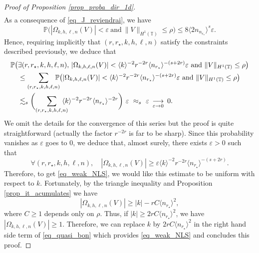 \begin{proof}[Proof of Proposition \ref{prop_proba_dir_1d}]
\begin{multline*}
\end{multline*}
As a consequence of \eqref{eq_J_reviendrai}, we have
\[
\mathbb{P}\big(|\Omega_{k,h,\ell,n}(V)| < \varepsilon \ \text{and} \ \| V\|_{H^1(\mathbb{T})} \leq \rho \big) \leq 8 \langle 2n_{n_{r_\star}} \rangle^{s} \varepsilon.
\]
Hence, requiring implicitly that $(r,r_\star,k,h,\ell,n)$ satisfy the constraints described previously, we deduce that
\begin{equation*}
\begin{split}
\mathbb{P}\big(&\exists (r,r_\star,k,h,\ell,n),\, |\Omega_{k,h,\ell,n}(V)| < \langle k \rangle^{-2} r^{-2r} \langle n_{r_\star} \rangle^{-(s+2r)} \varepsilon \text{ and } \| V\|_{H^1(\mathbb{T})} \leq \rho \big) \\
&\leq \sum_{(r,r_\star,k,h,\ell,n)}\hspace*{-3mm} \mathbb{P}\big(|\Omega_{k,h,\ell,n}(V)| < \langle k \rangle^{-2} r^{-2r} \langle n_{r_\star} \rangle^{-(s+2r)} \varepsilon \text{ and } \| V\|_{H^1(\mathbb{T})} \leq \rho \big) \\
&\lesssim_s \biggl(\sum_{(r,r_\star,k,h,\ell,n)}\hspace*{-3mm} \langle k \rangle^{-2} r^{-2r} \langle n_{r_\star} \rangle^{-2r} \biggr) \ \varepsilon \ \approx_s \ \varepsilon \ \mathop{\longrightarrow}_{\varepsilon \to 0} \ 0.
\end{split}
\end{equation*}
We omit the details for the convergence of this series but the proof is quite straightforward (actually the factor $r^{-2r}$ is far to be sharp). Since this probability vanishes as $\varepsilon$ goes to $0$, we deduce that, almost surely, there exists $\varepsilon>0$ such that
\begin{equation}
\label{eq_quasi_bon}
\forall (r,r_\star,k,h,\ell,n), \quad |\Omega_{k,h,\ell,n}(V)| \geq \varepsilon \langle k \rangle^{-2} r^{-2r} \langle n_{r_\star} \rangle^{-(s+2r)}.
\end{equation}
Therefore, to get \eqref{eq_weak_NLS}, we would like this estimate to be uniform with respect to $k$. Fortunately, by the triangle inequality and Proposition \ref{prop_it_acumulates} we have
\[
|\Omega_{k,h,\ell,n}(V)| \geq |k| - r C \langle n_{r_\star} \rangle^{2},
\]
where $C\geq 1$ depends only on $\rho$. Thus, if $|k|\geq 2 r C \langle n_{r_\star} \rangle^{2}$, we have $|\Omega_{k,h,\ell,n}(V)| \geq 1$. Therefore, we can replace $k$ by $ 2 r C \langle n_{r_\star} \rangle^{2}$ in the right hand side term of \eqref{eq_quasi_bon} which provides \eqref{eq_weak_NLS} and concludes this proof.
\end{proof}

